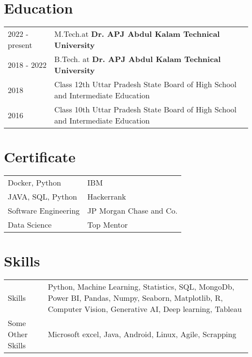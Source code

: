 \documentclass[a4paper,12pt]{article}
\begin{document}
\section{Education}
\begin{tabularx}{\linewidth}{@{}l X@{}}	
2022 - present & M.Tech.at \textbf{Dr. APJ Abdul Kalam Technical University} \hfill \normalsize  \\

2018 - 2022 & B.Tech. at \textbf{Dr. APJ Abdul Kalam Technical University} \hfill \\ 

2018 & Class 12th Uttar Pradesh State Board of High School and Intermediate Education \hfill   \\

2016 & Class 10th Uttar Pradesh State Board of High School and Intermediate Education \hfill   \\
\end{tabularx}

\section{Certificate}
\begin{tabularx}{\linewidth}{@{}l X@{}}	
Docker, Python & IBM\hfill \normalsize  \\

JAVA, SQL, Python & Hackerrank   \hfill \\ 

Software Engineering & JP Morgan Chase and Co. \hfill   \\

Data Science & Top Mentor\hfill   \\
\end{tabularx}


\section{Skills}
\begin{tabularx}{\linewidth}{@{}l X@{}}
Skills &  \normalsize{Python, Machine Learning, Statistics, SQL, MongoDb, Power BI, Pandas, Numpy, Seaborn, Matplotlib, R, Computer Vision, Generative AI, Deep learning, Tableau}\\
Some Other Skills  &  \normalsize{Microsoft excel, Java, Android, Linux, Agile, Scrapping}\\  
\end{tabularx}

\vfill
{}
\end{document}
